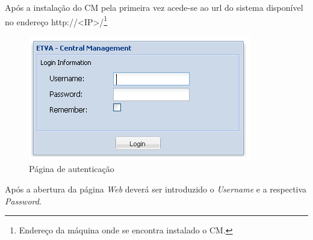 Após a instalação do CM pela primeira vez acede-se ao url do sistema disponível no endereço http://<IP>/\footnote{Endereço da máquina onde se encontra instalado o CM.}

\begin{figure}[H]
	\begin{center}
	\includegraphics[scale=0.7]{screenshots/login.png}
	\caption{Página de autenticação}
	\label{fig:login}
	\end{center}
\end{figure}

Após a abertura da página \emph{Web} deverá ser introduzido o \emph{Username} e a respectiva \emph{Password}.

